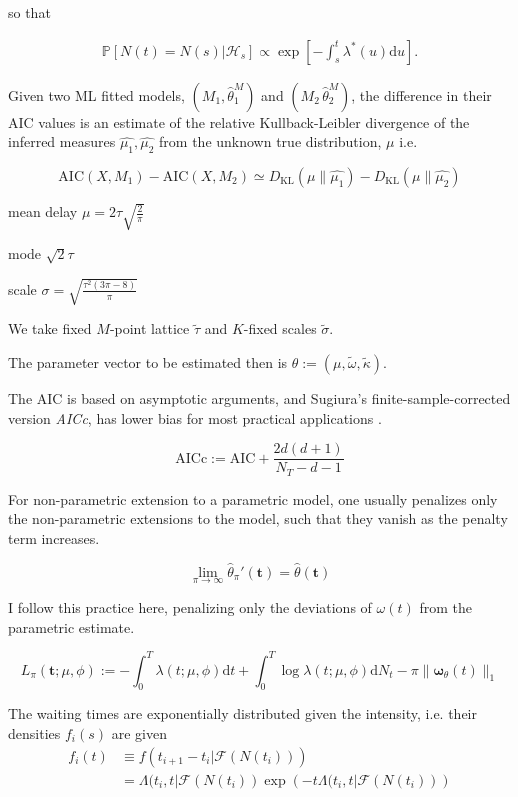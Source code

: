 \documentclass[11pt]{article}
\newcommand{\dd}{\mathrm{d}}
\newcommand{\bb}[1]{\mathbb{#1}}
\renewcommand{\v}[1]{\boldsymbol{#1}}
\newcommand{\cc}[1]{\mathcal{#1}}
\renewcommand{\cc}[1]{\mathcal{#1}}
\begin{document}
so that

\[\begin{aligned}
\bb P\left[N(t)=N(s)|\cc{H}_s\right]\propto\exp\left[-\int_{s}^{t}\lambda^*(u) \dd u\right]
.\end{aligned}\]

    Given two ML fitted models, \((M_1,\hat{\theta}^M_1)\) and
\((M_2\,\hat{\theta}^M_2)\), the difference in their AIC values is an
estimate of the relative Kullback-Leibler divergence of the inferred
measures \(\hat{\mu_1},\hat{\mu_2}\) from the unknown true distribution,
\(\mu\) i.e.

\[\mathrm{AIC}(X,M_1)-\mathrm{AIC}(X,M_2) \simeq D_\mathrm{KL}(\mu\|\hat{\mu_1}) - D_\mathrm{KL}(\mu\|\hat{\mu_2})\]

    mean delay \(\mu=2\tau \sqrt{\frac{2}{\pi}}\)

mode \(\sqrt{2}\tau\)

scale \(\sigma=\sqrt{\frac{\tau^2(3 \pi - 8)}{\pi}}\)

We take fixed \(M\)-point lattice \(\tilde{\tau}\) and \(K\)-fixed
scales \(\tilde{\sigma}.\)

The parameter vector to be estimated then is
\(\theta:=(\mu, \tilde{\omega}, \tilde{\kappa}).\)

    The AIC is based on asymptotic arguments, and Sugiura's
finite-sample-corrected version \emph{AICc}, has lower bias for most
practical applications \cite{sugiura_further_1978}.

\[{\mathrm {AICc}}:={\mathrm {AIC}}+{\frac {2d(d+1)}{N_T-d-1}}\]

    For non-parametric extension to a parametric model, one usually
penalizes only the non-parametric extensions to the model, such that
they vanish as the penalty term increases. \cite{green_penalized_1987}

\[\lim_{\pi\to\infty}\hat{\theta}_\pi'(\v t) =\hat{\theta}(\v t)\]

I follow this practice here, penalizing only the deviations of
\(\omega(t)\) from the parametric estimate.

\[L_\pi(\v t;\mu,\phi):=-\int_0^T\lambda(t;\mu,\phi) \dd t + \int_0^T\log \lambda(t;\mu,\phi) \dd N_t - \pi\|\v \omega_\theta(t)\|_1\]

    The waiting times are exponentially distributed given the intensity,
i.e. their densities \(f_i(s)\) are given \[\begin{aligned}
f_i(t)&\equiv f(t_{i+1}-t_i|\mathcal{F}(N(t_i)))\\
&=\Lambda(t_i,t|\mathcal{F}(N(t_i))\exp\left(-t\Lambda(t_i,t|\mathcal{F}(N(t_i))\right)
\end{aligned}\]
\end{document}
